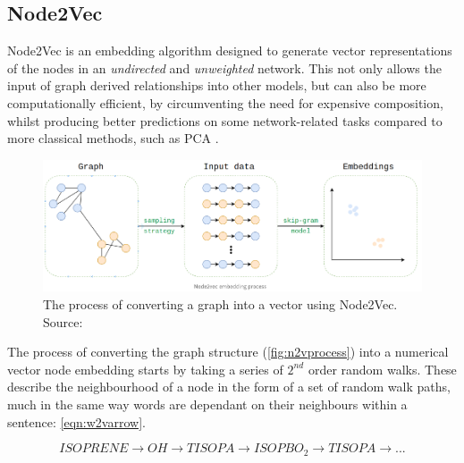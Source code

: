\subsection{Node2Vec}\label{sec:n2v}
 Node2Vec is an embedding algorithm designed to generate vector representations of the nodes in an \textit{undirected} and \textit{unweighted} network. This not only allows the input of graph derived relationships into other models, but can also be more computationally efficient, by circumventing the need for expensive composition, whilst producing better predictions on some network-related tasks compared to more classical methods, such as PCA \citep{node2vec}.


\begin{figure}[H]
  \centering
\includegraphics[width=\textwidth]{4fig/n2vproc.png}
\caption{The process of converting a graph into a vector using Node2Vec. Source:\citep{n2vimg}}\label{fig:n2vprocess}
\end{figure}


The process of converting the graph structure (\autoref{fig:n2vprocess}) into a numerical vector node embedding starts by taking a series of $2^{nd}$ order random walks. These describe the neighbourhood of a node in the form of a set of random walk paths, much in the same way words are dependant on their neighbours within a sentence: \autoref{eqn:w2varrow}.


\begin{equation}
ISOPRENE \rightarrow OH \rightarrow TISOPA \rightarrow ISOPBO_2 \rightarrow TISOPA \rightarrow...
\label{eqn:w2varrow}
\end{equation}


